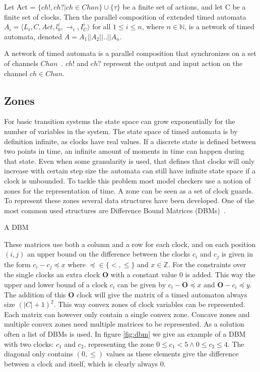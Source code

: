 \begin{mydef}
\label{def:networkTA}
Let Act = $\{ch!,ch?|ch \in Chan\} \cup \{\tau\}$ be a finite set of actions, and let C be a finite set of clocks. Then the parallel composition of extended timed automata $A_i = \langle L_i, C, Act, l^i_0, \rightarrow_{i}, I^i_C\rangle$ for all $1 \leq i \leq n$, where $n \in \mathbb{N}$, is a network of timed automata, denoted $A = A_1||A_2||..||A_n$.
\end{mydef}

A network of timed automata is a parallel composition that synchronizes on a set of channels $Chan$~\cite{UPPAAL}. $ch!$ and $ch?$ represent the output and input action on the channel $ch \in Chan$.


\subsection{Zones}
For basic transition systems the state space can grow exponentially for the number of variables in the system. The state space of timed automata is by definition infinite, as clocks have real values. If a discrete state is defined between two points in time, an infinite amount of moments in time can happen during that state. Even when some granularity is used, that defines that clocks will only increase with certain step size the automata can still have infinite state space if a clock is unbounded. To tackle this problem most model checkers use a notion of zones for the representation of time. A zone can be seen as a set of clock guards. To represent these zones several data structures have been developed. One of the most common used structures are Difference Bound Matrices (DBMs)~\cite{dbmorig,bengtsson2002clocks}.

\begin{mydef}
A DBM
\end{mydef}
 
These matrices use both a column and a row for each clock, and on each position $(i,j)$ an upper bound on the difference between the clocks $c_i$ and $c_j$ is given in the form $c_i - c_j \preceq x$ where $\preceq \in \{<, \leq\}$ and $x \in \mathbb{Z}$. For the constraints over the single clocks an extra clock $\mathbf{O}$ with a constant value 0 is added. This way the upper and lower bound of a clock $c_i$ can be given by $c_i - \mathbf{O} \preceq x$ and $\mathbf{O} - c_i \preceq y$. The addition of this $\mathbf{O}$ clock will give the matrix of a timed automaton always size $(|C|+1)^2$. This way convex zones of clock variables can be represented. Each matrix can however only contain a single convex zone. Concave zones and multiple convex zones need multiple matrices to be represented. As a solution often a list of DBMs is used. In figure \ref{fig:dbm} we give an example of a DBM with two clocks: $c_1$ and $c_2$, representing the zone $0 \leq c_1 < 5 \wedge 0 \leq c_2 \leq 4$. The diagonal only contains $(0,\leq)$ values as these elements give the difference between a clock and itself, which is clearly always 0.

